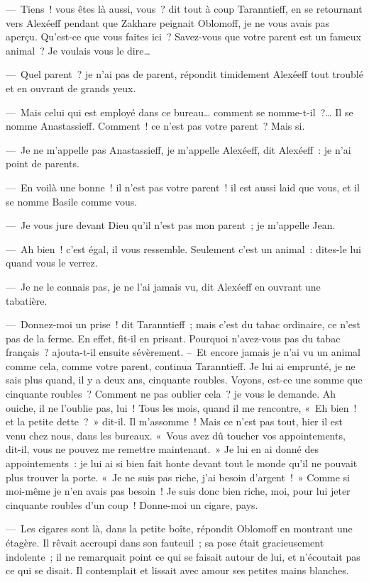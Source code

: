 \documentclass[french,twoside]{book} %
\begin{document}
— Tiens ! vous êtes là aussi, vous ? dit tout à coup Taranntieff, en se retournant vers Alexéeff pendant que Zakhare peignait Oblomoff, je ne vous avais pas aperçu. Qu’est-ce que vous faites ici ? Savez-vous que votre parent est un fameux animal ? Je voulais vous le dire…\par
— Quel parent ? je n’ai pas de parent, répondit timidement Alexéeff tout troublé et en ouvrant de grands yeux.\par
— Mais celui qui est employé dans ce bureau… comment se nomme-t-il ?… Il se nomme Anastassieff. Comment ! ce n’est pas votre parent ? Mais si.\par
— Je ne m’appelle pas Anastassieff, je m’appelle Alexéeff, dit Alexéeff : je n’ai point de parents.\par
— En voilà une bonne ! il n’est pas votre parent ! il est aussi laid que vous, et il se nomme Basile comme vous.\par
— Je vous jure devant Dieu qu’il n’est pas mon parent ; je m’appelle Jean.\par
— Ah bien ! c’est égal, il vous ressemble. Seulement c’est un animal : dites-le lui quand vous le verrez.\par
— Je ne le connais pas, je ne l’ai jamais vu, dit Alexéeff en ouvrant une tabatière.\par
— Donnez-moi un prise ! dit Taranntieff ; mais c’est du tabac ordinaire, ce n’est pas de la ferme. En effet, fit-il en prisant. Pourquoi n’avez-vous pas du tabac français ? ajouta-t-il ensuite sévèrement. – Et encore jamais je n’ai vu un animal comme cela, comme votre parent, continua Taranntieff. Je lui ai emprunté, je ne sais plus quand, il y a deux ans, cinquante roubles. Voyons, est-ce une somme que cinquante roubles ? Comment ne pas oublier cela ? je vous le demande. Ah ouiche, il ne l’oublie pas, lui ! Tous les mois, quand il me rencontre, « Eh bien ! et la petite dette ? » dit-il. Il m’assomme ! Mais ce n’est pas tout, hier il est venu chez nous, dans les bureaux. « Vous avez dû toucher vos appointements, dit-il, vous ne pouvez me remettre maintenant. » Je lui en ai donné des appointements : je lui ai si bien fait honte devant tout le monde qu’il ne pouvait plus trouver la porte. « Je ne suis pas riche, j’ai besoin d’argent ! » Comme si moi-même je n’en avais pas besoin ! Je suis donc bien riche, moi, pour lui jeter cinquante roubles d’un coup ! Donne-moi un cigare, pays.\par
— Les cigares sont là, dans la petite boîte, répondit Oblomoff en montrant une étagère. Il rêvait accroupi dans son fauteuil ; sa pose était gracieusement indolente ; il ne remarquait point ce qui se faisait autour de lui, et n’écoutait pas ce qui se disait. Il contemplait et lissait avec amour ses petites mains blanches.\par
\end{document}

